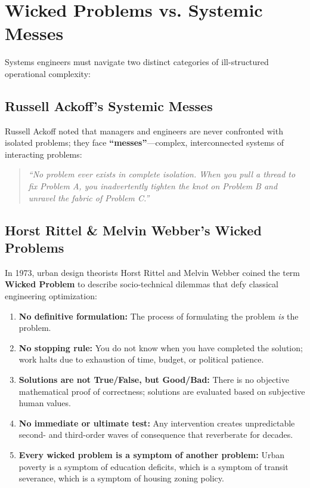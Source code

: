 \section{Wicked Problems vs. Systemic Messes}
\label{sec:wicked_problems}

Systems engineers must navigate two distinct categories of ill-structured operational complexity:

\subsection{Russell Ackoff's Systemic Messes}
Russell Ackoff noted that managers and engineers are never confronted with isolated problems; they face \textbf{``messes''}---complex, interconnected systems of interacting problems:
\begin{quote}
\textit{``No problem ever exists in complete isolation. When you pull a thread to fix Problem A, you inadvertently tighten the knot on Problem B and unravel the fabric of Problem C.''}
\end{quote}

\subsection{Horst Rittel \& Melvin Webber's Wicked Problems}
In 1973, urban design theorists Horst Rittel and Melvin Webber coined the term \textbf{Wicked Problem} to describe socio-technical dilemmas that defy classical engineering optimization:
\begin{enumerate}[leftmargin=2em]
    \item \textbf{No definitive formulation:} The process of formulating the problem \textit{is} the problem.
    \item \textbf{No stopping rule:} You do not know when you have completed the solution; work halts due to exhaustion of time, budget, or political patience.
    \item \textbf{Solutions are not True/False, but Good/Bad:} There is no objective mathematical proof of correctness; solutions are evaluated based on subjective human values.
    \item \textbf{No immediate or ultimate test:} Any intervention creates unpredictable second- and third-order waves of consequence that reverberate for decades.
    \item \textbf{Every wicked problem is a symptom of another problem:} Urban poverty is a symptom of education deficits, which is a symptom of transit severance, which is a symptom of housing zoning policy.
\end{enumerate}

